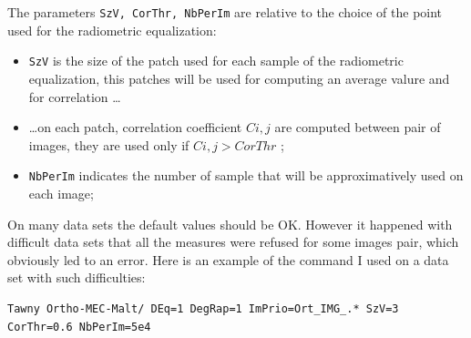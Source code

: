 The parameters {\tt SzV, CorThr, NbPerIm} are relative to the choice of the point
used for the radiometric equalization:


\begin{itemize}
   \item {\tt SzV} is the size of the patch used for each sample of the radiometric equalization,
         this patches will be used for computing an average valure and for correlation  \dots

   \item  \dots on each patch, correlation coefficient  $C{i,j}$ are computed between pair 
          of images, they are used only if  $C{i,j} > CorThr$ ;
 
   \item {\tt NbPerIm} indicates the number of sample that will be approximatively used on each image;

\end{itemize}


On many data sets the default values should be OK. However it happened with difficult data
sets that all the measures were refused for some images pair, which obviously led to an error.
Here is an example of the command I used on a data set with such difficulties:


\begin{verbatim}
Tawny Ortho-MEC-Malt/ DEq=1 DegRap=1 ImPrio=Ort_IMG_.* SzV=3 CorThr=0.6 NbPerIm=5e4
\end{verbatim}


